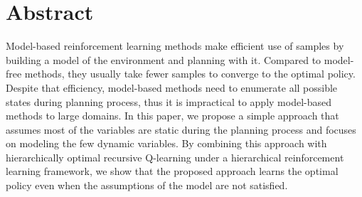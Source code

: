 
\chapter{Abstract}

Model-based reinforcement learning methods make efficient use of samples by 
building a model of the environment and planning with it.
Compared to model-free methods, they usually take fewer samples to converge to the optimal policy.
Despite that efficiency, model-based methods
need to enumerate all possible states during planning process,
thus it is impractical to apply model-based methods to large domains.
In this paper, we propose a simple approach that assumes most of the variables 
are static during the planning process and focuses on modeling the few dynamic variables.
By combining this approach with 
hierarchically optimal recursive Q-learning under 
a hierarchical reinforcement learning framework, we show that
the proposed approach learns the optimal policy even when
the assumptions of the model are not satisfied.

\vfill
\begin{center}
\begin{sf}
\end{sf}
\end{center}
